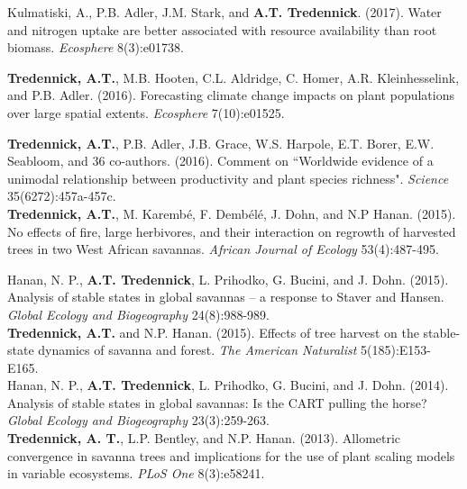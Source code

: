 \documentclass[margin,line]{resume}
\begin{document}
\begin{resume}
      Kulmatiski, A., P.B. Adler, J.M. Stark, and \textbf{A.T. Tredennick}. (2017). Water and nitrogen uptake are better associated with resource availability than root biomass. \emph{Ecosphere} 8(3):e01738.
	
	  \textbf{Tredennick, A.T.}, M.B. Hooten, C.L. Aldridge, C. Homer, A.R. Kleinhesselink, and P.B. Adler. (2016). Forecasting climate change impacts on plant populations over large spatial extents. \emph{Ecosphere} 7(10):e01525.
	
	\textbf{Tredennick, A.T.}, P.B. Adler, J.B. Grace, W.S. Harpole, E.T. Borer, E.W. Seabloom, and 36 co-authors. (2016). Comment on ``Worldwide evidence of a unimodal relationship between productivity and plant species richness". \textsl{Science} 35(6272):457a-457c. \vspace{-6mm}\\%
	
	\textbf{Tredennick, A.T.}, M. Karemb\'{e}, F. Demb\'{e}l\'{e}, J. Dohn, and N.P Hanan. (2015). No effects of fire, large herbivores, and their interaction on regrowth of harvested trees in two West African savannas. \textsl{African Journal of Ecology} 53(4):487-495. \vspace{-6mm}\\%
	
			\newpage{}
	
	Hanan, N. P., \textbf{A.T. Tredennick}, L. Prihodko, G. Bucini, and J. Dohn. (2015). Analysis of stable states in global savannas -- a response to Staver and Hansen. 	\textsl{Global Ecology and Biogeography} 24(8):988-989. \vspace{-6mm}\\%
   
     	\textbf{Tredennick, A.T.} and N.P. Hanan. (2015). Effects of tree harvest on the stable-state dynamics of savanna and forest. \textsl{The American Naturalist} 5(185):E153-E165. \vspace{-6mm} \\%
	
	Hanan, N. P., \textbf{A.T. Tredennick}, L. Prihodko, G. Bucini, and J. Dohn. (2014). Analysis of stable states in global savannas: Is the CART pulling the horse? 	\textsl{Global Ecology and Biogeography} 23(3):259-263. \vspace{-6mm}\\%
	
	\textbf{Tredennick, A. T.}, L.P. Bentley, and N.P. Hanan. (2013). Allometric convergence in savanna trees and implications for the use of plant scaling models in 	variable ecosystems. \textsl{PLoS One} 8(3):e58241. \vspace{-6mm}\\%


\end{resume}
\end{document}
